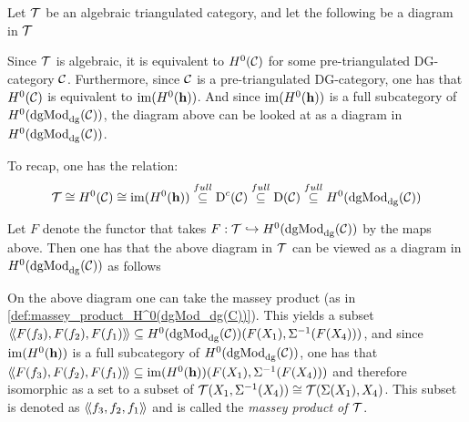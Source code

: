 \begin{definition}
    Let \( {\mathcal{T}} \) be an algebraic triangulated category, and let the following be a diagram in \( {\mathcal{T}} \)
    \begin{center}
    \end{center}

    Since \( {\mathcal{T}} \) is algebraic, it is equivalent to \( H^0({\mathcal{C}}) \) for some pre-triangulated DG-category \( {\mathcal{C}} \). Furthermore, since \( {\mathcal{C}} \) is a pre-triangulated DG-category, one has that \( H^0({\mathcal{C}}) \) is equivalent to \( \operatorname{im}(H^0(\mathbf{h})) \). And since \( \operatorname{im}(H^0(\mathbf{h})) \) is a full subcategory of \( H^0(\operatorname{dgMod}_{\operatorname{dg}}({\mathcal{C}})) \), the diagram above can be looked at as a diagram in \( H^0(\operatorname{dgMod}_{\operatorname{dg}}({\mathcal{C}})) \).

    To recap, one has the relation:
    \[
        {\mathcal{T}} \cong H^0({\mathcal{C}}) \cong \operatorname{im}(H^0(\mathbf{h})) \stackrel{full}{\subseteq} \operatorname{D}^c({\mathcal{C}}) \stackrel{full}{\subseteq} \operatorname{D}({\mathcal{C}}) \stackrel{full}{\subseteq} H^0(\operatorname{dgMod}_{\operatorname{dg}}({\mathcal{C}}))
    \]

    Let \( F \) denote the functor that takes \( F: {\mathcal{T}} \hookrightarrow H^0(\operatorname{dgMod}_{\operatorname{dg}}({\mathcal{C}})) \) by the maps above. Then one has that the above diagram in \( {\mathcal{T}} \) can be viewed as a diagram in \( H^0(\operatorname{dgMod}_{\operatorname{dg}}({\mathcal{C}})) \) as follows
    \begin{center}
    \end{center}
    
    On the above diagram one can take the massey product (as in \autoref{def:massey_product_H^0(dgMod_dg(C))}). This yields a subset \( \langle \! \langle F(f_3), F(f_2), F(f_1) \rangle \! \rangle \subseteq H^0(\operatorname{dgMod}_{\operatorname{dg}}({\mathcal{C}}))(F(X_1), \Sigma^{-1}(F(X_4))) \), and since \( \operatorname{im}(H^0(\mathbf{h})) \) is a full subcategory of \( H^0(\operatorname{dgMod}_{\operatorname{dg}}({\mathcal{C}})) \), one has that \( \langle \! \langle F(f_3), F(f_2), F(f_1) \rangle \! \rangle \subseteq \operatorname{im}(H^0(\mathbf{h}))(F(X_1), \Sigma^{-1}(F(X_4))) \) and therefore isomorphic as a set to a subset of \( {\mathcal{T}}(X_1, \Sigma^{-1}(X_4)) \cong {\mathcal{T}}(\Sigma(X_1), X_4) \). This subset is denoted as \( \langle \! \langle f_3, f_2, f_1 \rangle \! \rangle \) and is called the \emph{massey product of \( {\mathcal{T}} \)}.
\end{definition}

